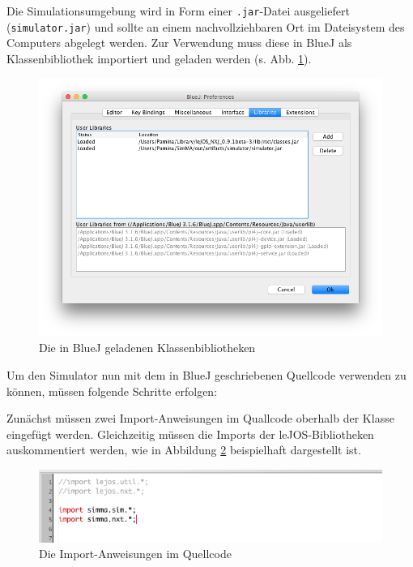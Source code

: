 \documentclass[paper=a4, DIV=calc, BCOR=12mm, twoside=on, onecolumn=on, open = right, titlepage =on, parskip =half-, headsepline = on, footsepline = off, chapterprefix = off, appendixprefix = on, fontsize = 12pt, numbers = noenddot, abstract = on]{scrbook}
\begin{document}

Die Simulationsumgebung wird in Form einer \texttt{.jar}-Datei ausgeliefert (\texttt{simulator.jar}) und sollte an einem nachvollziehbaren Ort im Dateisystem des Computers abgelegt werden. Zur Verwendung muss diese in BlueJ als Klassenbibliothek importiert und geladen werden (s. Abb. \ref{fig:library}).

\begin{figure}[htb]
\centering
\includegraphics[width=\textwidth]{images/Anleitung_Library.png}
\caption{Die in BlueJ geladenen Klassenbibliotheken}
\label{fig:library}
\end{figure}


Um den Simulator nun mit dem in BlueJ geschriebenen Quellcode verwenden zu können, müssen folgende Schritte erfolgen:

Zunächst müssen zwei Import-Anweisungen im Quallcode oberhalb der Klasse eingefügt werden. Gleichzeitig müssen die Imports der leJOS-Bibliotheken auskommentiert werden, wie in Abbildung \ref{fig:import} beispielhaft dargestellt ist.

\begin{figure}[htb]
\centering
\includegraphics[width=\textwidth]{images/Anleitung_Import.png}
\caption{Die Import-Anweisungen im Quellcode}
\label{fig:import}
\end{figure}
\end{document}
